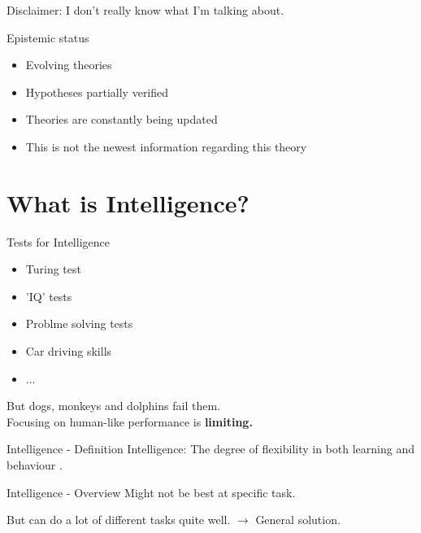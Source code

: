
\begin{frame}[standout]
    Disclaimer: \pause I don't really know what I'm talking about.
\end{frame}

\begin{frame}[c]{Epistemic status}
    \Large
    \begin{itemize}[<+(1)->]
        \item Evolving theories
        \item Hypotheses partially verified
        \item Theories are constantly being updated
        \item This is not the newest information regarding this theory
    \end{itemize}
\end{frame}


\section{What is Intelligence?}


\begin{frame}[c]{Tests for Intelligence}
    \Large
    \begin{itemize}[<+(1)->]
        \item Turing test
        \item 'IQ' tests
        \item Problme solving tests
        \item Car driving skills
        \item ...
    \end{itemize}
    \pause
    But dogs, monkeys and dolphins fail them. \\ \pause
    Focusing on human-like performance is \textbf{limiting.}
\end{frame}




%
%


\begin{frame}[c]{Intelligence - Definition}
    \Large
    \pause
    Intelligence: The degree of flexibility in both learning and behaviour \cite{hawkins2017book}.
\end{frame}


\begin{frame}[c]{Intelligence - Overview}
    \Large
    \pause
    Might not be best at specific task.

    \pause But can do a lot of different tasks quite well.
    \newline
    \newline
    \pause
    $\rightarrow$ General solution.
\end{frame}


